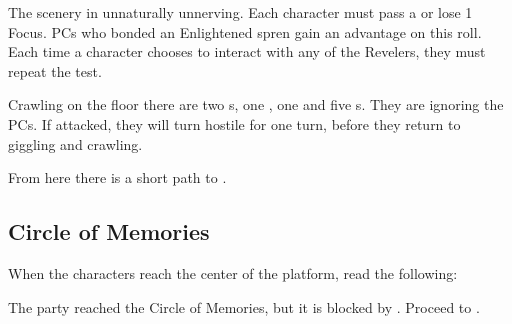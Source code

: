 The scenery in unnaturally unnerving. Each character must pass a  or lose 1 Focus. PCs who bonded an Enlightened spren gain an advantage on this roll. Each time a character chooses to interact with any of the Revelers, they must repeat the \skillDiscipline{} test.

Crawling on the floor there are two \enemyRevelerDrinking{}s, one \enemyRevelerWealthy{}, one \enemyRevelerMusical{} and five \enemyCultist{}s. They are ignoring the PCs. If attacked, they will turn hostile for one turn, before they return to giggling and crawling.

From here there is a short path to . 







\subsection{Circle of Memories}
\label{ssec:revelryCenter}

When the characters reach the center of the platform, read the following:


The party reached the Circle of Memories, but it is blocked by \npcHeartRevelTitle{}. Proceed to .

